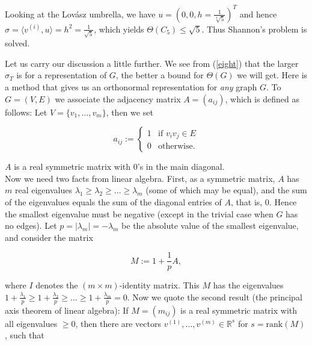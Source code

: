 Looking at the Lov\'asz umbrella, we have $u = (0, 0, h = {\frac{1}{\sqrt[4]{5}}})^T$ and hence
$\sigma = \langle v^{(i)}, u \rangle = h^2 = {\frac{1}{\sqrt{5}}}$, which yields $\Theta(C_5) \leq \sqrt{5}$. Thus Shannon's 
problem is solved.


\setnewpagemargins


Let us carry our discussion a little further. We see from (\ref{eight}) that the larger $\sigma_T$
is for a representation of $G$, the better a bound for $\Theta(G)$ we will get. Here 
is a method that gives us an orthonormal representation for \textit{any} graph $G$. 
To $G = (V, E)$ we associate the adjacency matrix $A = (a_{ij})$, which is 
defined as follows: Let $V = \{v_1,\ldots,v_m\}$, then we set

\[
a_{ij} := \left\{ \begin{array}{rcl}
  1 & \mbox{if $v_i v_j \in E$}\\
  0 & \mbox{otherwise.}
  \end{array}\right.
\]

$A$ is a real symmetric matrix with $0$'s in the main diagonal.\\ 
Now we need two facts from linear algebra. First, as a symmetric matrix, 
$A$ has $m$ real eigenvalues $\lambda_1 \geq \lambda_2 \geq \ldots \geq \lambda_m$ \spaceskip(some of which may be equal),
and the sum of the eigenvalues equals the sum of the diagonal 
entries of $A$, that is, 0. Hence the smallest eigenvalue must be negative 
(except in the trivial case when $G$ has no edges). {Let $p = |\lambda_m| = -\lambda_m$} be 
the absolute value of the smallest eigenvalue, and consider the matrix

\[
M := 1 + {\frac{1}{p}}A,
\]

where $I$ denotes the $(m \times m)$-identity matrix. This $M$ has the eigenvalues
$1+{\frac{\lambda_1}{p}} \geq 1+{\frac{\lambda_2}{p}} \geq \ldots \geq 1+{\frac{\lambda_m}{p}} =0$. Now we quote the second result (the principal axis theorem of linear algebra):
If $M = (m_{ij})$ is a real symmetric matrix with all eigenvalues $\geq 0$,
then there are vectors $v^{(1)}, \ldots, v^{(m)} \in \mathbb{R}^s$
for $s = \text{rank}(M)$, such that 

